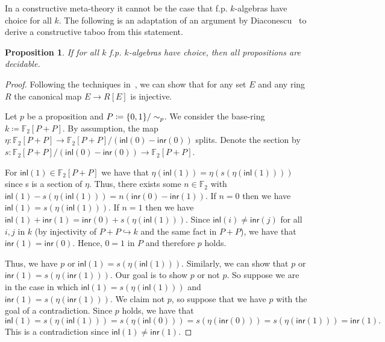 \documentclass[10pt,a4paper]{article}
\newtheorem{proposition}[theorem]{Proposition}
\theoremstyle{definition}
\theoremstyle{remark}
\newcommand\inl{\mathsf{inl}}
\newcommand\inr{\mathsf{inr}}
\DeclarePairedDelimiter\set{\{}{\}}
\begin{document}

In a constructive meta-theory it cannot be the case that f.p. \(k\)-algebras have choice for all \(k\).
The following is an adaptation of an argument by Diaconescu~\cite{diaconescu1975choice} to derive a constructive taboo from this statement.

\begin{proposition}
  If for all \(k\) f.p. \(k\)-algebras have choice, then all propositions are decidable.
\end{proposition}
\begin{proof}
  Following the techniques in~\cite{mines}, we can show that for any set \(E\) and any ring \(R\) the canonical map \(E \to R[E]\) is injective.

  Let \(p\) be a proposition and \(P \coloneqq \set{0,1} / \sim_p\).
  We consider the base-ring \(k \coloneqq \mathbb{F}_2[P + P]\).
  By assumption, the map \(\eta \colon \mathbb{F}_2[P + P] \to \mathbb{F}_2[P + P] / (\inl(0) - \inr(0))\) splits.
  Denote the section by \(s : \mathbb{F}_2[P + P] / (\inl(0) - \inr(0)) \to \mathbb{F}_2[P + P]\).

  For \(\inl(1) \in \mathbb{F}_2[P + P]\) we have that \(\eta(\inl(1)) = \eta(s(\eta(\inl(1))))\) since s is a section of \(\eta\).
  Thus, there exists some \(n \in \mathbb{F}_2\) with \(\inl(1) - s(\eta(\inl(1))) = n(\inr(0) - \inr(1))\).
  If \(n = 0\) then we have \(\inl(1) = s(\eta(\inl(1)))\).
  If \(n = 1\) then we have \(\inl(1) + \inr(1) = \inr(0) + s(\eta(\inl(1)))\).
  Since \(\inl(i) \ne \inr(j)\) for all \(i, j\) in \(k\) (by injectivity of \(P + P \hookrightarrow k\) and the same fact in \(P + P\)), we have that \(\inr(1) = \inr(0)\).
  Hence, \(0 = 1\) in \(P\) and therefore \(p\) holds.

  Thus, we have \(p\) or \(\inl(1) = s(\eta(\inl(1)))\).
  Similarly, we can show that \(p\) or \(\inr(1) = s(\eta(\inr(1)))\).
  Our goal is to show \(p\) or not \(p\).
  So suppose we are in the case in which \(\inl(1) = s(\eta(\inl(1)))\) and \(\inr(1) = s(\eta(\inr(1)))\).
  We claim not \(p\), so suppose that we have \(p\) with the goal of a contradiction.
  Since \(p\) holds, we have that
  \[
    \inl(1) = s(\eta(\inl(1))) = s(\eta(\inl(0))) = s(\eta(\inr(0))) = s(\eta(\inr(1))) = \inr(1).
  \]
  This is a contradiction since \(\inl(1) \ne \inr(1)\).
\end{proof}
\end{document}
